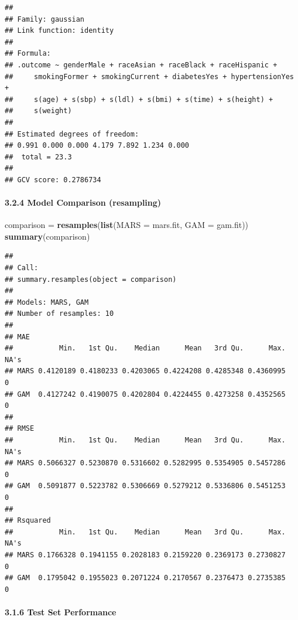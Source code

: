 \documentclass[
]{article}
\newenvironment{Shaded}{\begin{snugshade}}{\end{snugshade}}
\newcommand{\AttributeTok}[1]{\textcolor[rgb]{0.13,0.29,0.53}{#1}}
\newcommand{\FunctionTok}[1]{\textcolor[rgb]{0.13,0.29,0.53}{\textbf{#1}}}
\newcommand{\NormalTok}[1]{#1}
\newcommand{\OtherTok}[1]{\textcolor[rgb]{0.56,0.35,0.01}{#1}}
\begin{document}
\begin{verbatim}
## 
## Family: gaussian 
## Link function: identity 
## 
## Formula:
## .outcome ~ genderMale + raceAsian + raceBlack + raceHispanic + 
##     smokingFormer + smokingCurrent + diabetesYes + hypertensionYes + 
##     s(age) + s(sbp) + s(ldl) + s(bmi) + s(time) + s(height) + 
##     s(weight)
## 
## Estimated degrees of freedom:
## 0.991 0.000 0.000 4.179 7.892 1.234 0.000 
##  total = 23.3 
## 
## GCV score: 0.2786734
\end{verbatim}

\paragraph{3.2.4 Model Comparison
(resampling)}\label{model-comparison-resampling-1}

\begin{Shaded}
\begin{Highlighting}[]
\NormalTok{comparison }\OtherTok{=} \FunctionTok{resamples}\NormalTok{(}\FunctionTok{list}\NormalTok{(}\AttributeTok{MARS =}\NormalTok{ mars.fit, }\AttributeTok{GAM =}\NormalTok{ gam.fit))}
\FunctionTok{summary}\NormalTok{(comparison)}
\end{Highlighting}
\end{Shaded}

\begin{verbatim}
## 
## Call:
## summary.resamples(object = comparison)
## 
## Models: MARS, GAM 
## Number of resamples: 10 
## 
## MAE 
##           Min.   1st Qu.    Median      Mean   3rd Qu.      Max. NA's
## MARS 0.4120189 0.4180233 0.4203065 0.4224208 0.4285348 0.4360995    0
## GAM  0.4127242 0.4190075 0.4202804 0.4224455 0.4273258 0.4352565    0
## 
## RMSE 
##           Min.   1st Qu.    Median      Mean   3rd Qu.      Max. NA's
## MARS 0.5066327 0.5230870 0.5316602 0.5282995 0.5354905 0.5457286    0
## GAM  0.5091877 0.5223782 0.5306669 0.5279212 0.5336806 0.5451253    0
## 
## Rsquared 
##           Min.   1st Qu.    Median      Mean   3rd Qu.      Max. NA's
## MARS 0.1766328 0.1941155 0.2028183 0.2159220 0.2369173 0.2730827    0
## GAM  0.1795042 0.1955023 0.2071224 0.2170567 0.2376473 0.2735385    0
\end{verbatim}

\paragraph{3.1.6 Test Set Performance}\label{test-set-performance-1}
\end{document}
